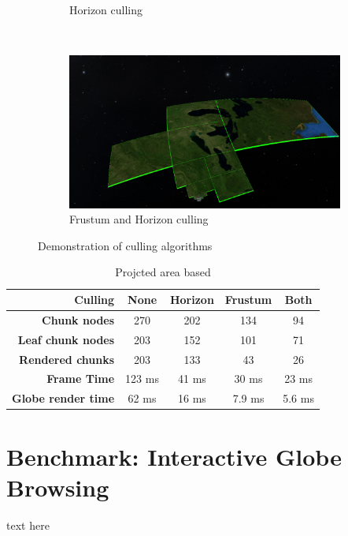 \begin{figure}[htbp]
\begin{subfigure}[bt]{0.48\textwidth}
        \caption{Horizon culling}
    \end{subfigure}
    ~
    \begin{subfigure}[bt]{0.48\textwidth}
        \includegraphics[width=\textwidth]{figures/results/culling/afh.png}
        \caption{Frustum and Horizon culling}
    \end{subfigure}
    \caption{Demonstration of culling algorithms}
    \label{fig:cullinga}
\end{figure}

\begin{table}
\centering
\caption[]{Projcted area based}
  \label{table:cullinga}
  \begin{tabular}{| r | c c c c |}
    \hline
      \textbf{Culling}            & \textbf{None} & \textbf{Horizon}  & \textbf{Frustum}  & \textbf{Both} \\ \hline
      \textbf{Chunk nodes}        & 270           & 202               & 134               & 94 \\ 
      \textbf{Leaf chunk nodes}   & 203           & 152               & 101               & 71 \\ 
      \textbf{Rendered chunks}    & 203           & 133               & 43                & 26 \\
      \textbf{Frame Time}         & 123 ms        & 41 ms             & 30 ms             & 23 ms \\
      \textbf{Globe render time}  & 62 ms         & 16 ms             & 7.9 ms            & 5.6 ms \\
    \hline
  \end{tabular}
\end{table}

\section{Benchmark: Interactive Globe Browsing}
text here

